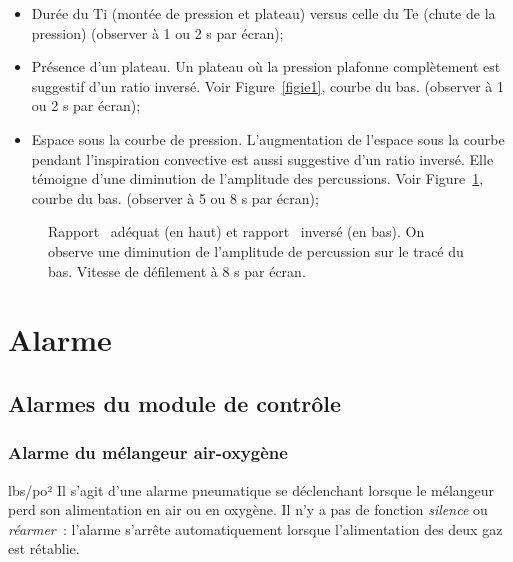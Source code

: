 \begin{itemize}
\item
  Durée du Ti (montée de pression et plateau) versus celle du Te (chute
  de la pression) (observer à 1 ou 2 s par écran);
\item
  Présence d'un plateau. Un plateau où la pression plafonne complètement
		est suggestif d'un ratio inversé. Voir Figure~\ref{figie1}, courbe du bas.
  (observer à 1 ou 2 s par écran);
\item
  Espace sous la courbe de pression. L'augmentation de l'espace sous la
  courbe pendant l'inspiration convective est aussi suggestive d'un
  ratio inversé. Elle témoigne d'une diminution de l'amplitude des
  percussions. Voir Figure~\ref{figie8}, courbe du bas. (observer à 5 ou 8 s par
  écran);
\end{itemize}

\begin{fullwidth}
\begin{figure}
	
	\caption[Rapport \ie\ adéquat et inversé (1 s par écran)]{Rapport \ie\ adéquat (en haut) et rapport \ie\ inversé (en
	bas). On observe sur le tracé du bas un Te trop court ne permettant pas
	à la pression de redescendre entre chaque percussion. La pression
	d'équilibre est donc rapidement atteinte à la percussion suivante. Il en
	résulte une faible amplitude de variation de pression à chaque
	percussion. Vitesse de défilement à 1 s par écran.}
	\label{figie1}

	
	\caption[Rapport \ie\ adéquat et inversé (8 s par écran)]{Rapport \ie\ adéquat (en haut) et rapport \ie\ inversé (en
	bas). On observe une diminution de l'amplitude de percussion sur le
	tracé du bas. Vitesse de défilement à 8 s par écran.}
	\label{figie8}
\end{figure}
\end{fullwidth}

\section{Alarme}

\subsection{Alarmes du module de contrôle}

\subsubsection*{Alarme du mélangeur air-oxygène}
lbs/po²
Il s'agit d'une alarme pneumatique se déclenchant lorsque le mélangeur
perd son alimentation en air ou en oxygène. Il n'y a pas de fonction
\emph{silence} ou \emph{réarmer~}: l'alarme s'arrête automatiquement
lorsque l'alimentation des deux gaz est rétablie.

